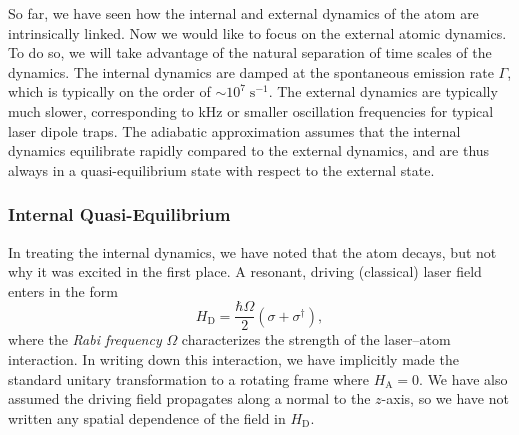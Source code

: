 \documentclass[12pt,aps,onecolum,superscriptaddress,footinbib,floatfix,showpacs]{revtex4-1}
\def\HA{H_\mathrm{\scriptscriptstyle A}}
\def\HD{H_\mathrm{\scriptscriptstyle D}}
\begin{document}
So far, we have seen how the internal and external dynamics of the
atom are intrinsically linked.  Now we would like to focus on the
external atomic dynamics.
To do so, we will take advantage of the natural separation of time
scales of the dynamics.  The internal dynamics are damped at
the spontaneous emission rate $\Gamma$, which is typically on the
order of $\sim\!\! 10^7\;\mathrm{s}^{-1}$.  The external
dynamics are typically much slower, corresponding to kHz or smaller
oscillation frequencies for typical laser dipole traps.
The adiabatic approximation assumes that the internal dynamics
equilibrate rapidly compared to the external dynamics,
and are thus always in a quasi-equilibrium state with respect to the
external state.


\subsubsection{Internal Quasi-Equilibrium}\label{section:quasiequilibrium}

In treating the internal dynamics, we have noted that the 
atom decays, but not why it was excited in the first place.
A resonant, driving (classical) laser field enters in the form 
\cite{Loudon83}
\begin{equation}
  \HD = \frac{\hbar\Omega}{2}\left(\sigma+\sigma^\dagger\right),
  \label{drivingHam}
\end{equation}
where the \textit{Rabi frequency} $\Omega$ characterizes the 
strength of the laser--atom interaction.
In writing down this interaction, we have implicitly made the
standard unitary transformation to a rotating frame where
$\HA=0$.
We have also assumed the driving field propagates along a normal to the
$z$-axis, so we have not written any spatial dependence of the field
in $\HD$.
\end{document}
